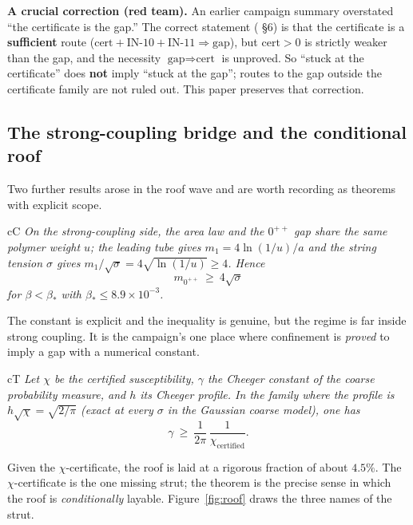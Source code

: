 \textbf{A crucial correction (red team).} An earlier campaign summary overstated ``the
certificate is the gap.'' The correct statement ( \S6) is that the
certificate is a \textbf{sufficient} route
($\text{cert}+\text{IN-10}+\text{IN-11}\Rightarrow\text{gap}$), but $\text{cert}>0$ is strictly
weaker than the gap, and the necessity $\text{gap}\Rightarrow\text{cert}$ is unproved. So
``stuck at the certificate'' does \textbf{not} imply ``stuck at the gap''; routes to the gap
outside the certificate family are not ruled out. This paper preserves that correction.

\subsection{The strong-coupling bridge and the conditional roof}
\label{sec:roof}

Two further results arose in the roof wave and are worth recording as theorems with explicit
scope.

\begin{claimbox}{cC}
\emph{On the strong-coupling side, the area law and the $0^{++}$ gap share the same polymer
weight $u$; the leading tube gives $m_1=4\ln(1/u)/a$ and the string tension $\sigma$
gives $m_1/\sqrt\sigma=4\sqrt{\ln(1/u)}\ge4$. Hence}
\[
m_{0^{++}}\ \ge\ 4\sqrt{\sigma}
\]
\emph{for $\beta<\beta_*$ with $\beta_*\le8.9\times10^{-3}$.}
\end{claimbox}

The constant is explicit and the inequality is genuine, but the regime is far inside strong
coupling. It is the campaign's one place where confinement is \emph{proved} to imply a gap with a
numerical constant.

\begin{claimbox}{cT}
\emph{Let $\chi$ be the certified susceptibility, $\gamma$ the Cheeger constant of the coarse
probability measure, and $h$ its Cheeger profile. In the family where the profile is
$h\sqrt\chi=\sqrt{2/\pi}$ (exact at every $\sigma$ in the Gaussian coarse model), one has}
\[
\gamma\ \ge\ \frac{1}{2\pi}\,\frac{1}{\chi_{\mathrm{certified}}} .
\]
\end{claimbox}

Given the $\chi$-certificate, the roof is laid at a rigorous fraction of about $4.5\%$. The
$\chi$-certificate is the one missing strut; the theorem is the precise sense in which the roof
is \emph{conditionally} layable. Figure~\ref{fig:roof} draws the three names of the strut.


